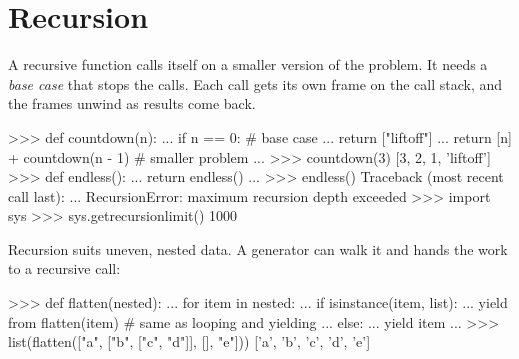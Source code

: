 \section{Recursion}

A recursive function calls itself on a smaller version of the problem. It needs a
\emph{base case} that stops the calls. Each call gets its own frame on the call stack, and the
frames unwind as results come back.

\begin{center}
\end{center}

\begin{pycode}
>>> def countdown(n):
...     if n == 0:                       # base case
...         return ["liftoff"]
...     return [n] + countdown(n - 1)    # smaller problem
...
>>> countdown(3)
[3, 2, 1, 'liftoff']
>>> def endless():
...     return endless()
...
>>> endless()
Traceback (most recent call last):
  ...
RecursionError: maximum recursion depth exceeded
>>> import sys
>>> sys.getrecursionlimit()
1000
\end{pycode}

Recursion suits uneven, nested data. A generator can walk it and  hands the
work to a recursive call:

\begin{pycode}
>>> def flatten(nested):
...     for item in nested:
...         if isinstance(item, list):
...             yield from flatten(item)      # same as looping and yielding
...         else:
...             yield item
...
>>> list(flatten(["a", ["b", ["c", "d"]], [], "e"]))
['a', 'b', 'c', 'd', 'e']
\end{pycode}

